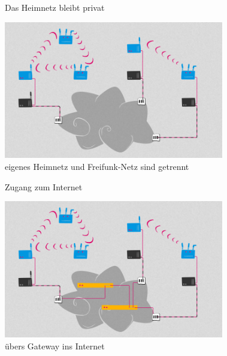 \documentclass[10pt]{beamer}
\begin{document}
    \begin{frame}{Das Heimnetz bleibt privat}
      \begin{center}
        \includegraphics[height=6cm]{images/network_4}\\
        \vspace{1em}
        eigenes Heimnetz und Freifunk-Netz sind getrennt
        \vspace{1em}
      \end{center}
    \end{frame}

    \begin{frame}{Zugang zum Internet}
      \begin{center}
        \includegraphics[height=6cm]{images/network_5}\\
        \vspace{1em}
        übers Gateway ins Internet
        \vspace{1em}
      \end{center}
    \end{frame}
\end{document}
